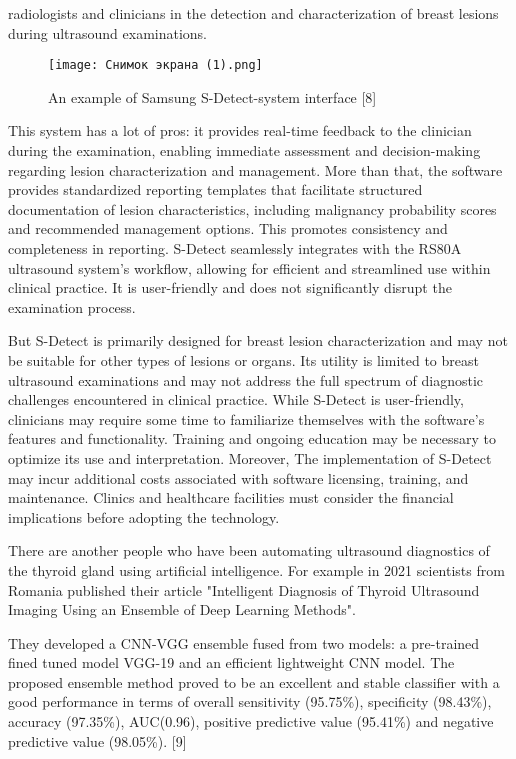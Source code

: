\documentclass[a4paper,10pt,twocolumn]{article}
\begin{document}
 
\setcounter{page}{288}
\vspace{-3 mm}
\hangindent=0.4cm radiologists and clinicians in the detection and characterization of breast lesions during ultrasound examinations.
  
\begin{figure}[h]
     \centering
     \texttt{[image: Снимок экрана (1).png]}
      \caption{\scriptsize{An example of Samsung S-Detect-system interface [8]}}
      \label{fig:figure}
\end{figure} 

This system has a lot of pros: it provides real-time feedback to the clinician during the examination, enabling
immediate assessment and decision-making regarding
lesion characterization and management. More than that,
the software provides standardized reporting templates
that facilitate structured documentation of lesion characteristics, including malignancy probability scores and recommended management options. This promotes consistency and completeness in reporting. S-Detect seamlessly
integrates with the RS80A ultrasound system’s workflow,
allowing for efficient and streamlined use within clinical
practice. It is user-friendly and does not significantly
disrupt the examination process.

But S-Detect is primarily designed for breast lesion
characterization and may not be suitable for other types
of lesions or organs. Its utility is limited to breast
ultrasound examinations and may not address the full
spectrum of diagnostic challenges encountered in clinical practice. While S-Detect is user-friendly, clinicians
may require some time to familiarize themselves with
the software’s features and functionality. Training and
ongoing education may be necessary to optimize its
use and interpretation. Moreover, The implementation
of S-Detect may incur additional costs associated with
software licensing, training, and maintenance. Clinics
and healthcare facilities must consider the financial implications before adopting the technology.

There are another people who have been automating
ultrasound diagnostics of the thyroid gland using artificial intelligence. For example in 2021 scientists from
Romania published their article "Intelligent Diagnosis of
Thyroid Ultrasound Imaging Using an Ensemble of Deep
Learning Methods".

They developed a CNN-VGG ensemble fused from two
models: a pre-trained fined tuned model VGG-19 and an
efficient lightweight CNN model. The proposed ensemble
method proved to be an excellent and stable classifier
with a good performance in terms of overall sensitivity
(95.75\%), specificity (98.43\%), accuracy (97.35\%), AUC(0.96), positive predictive value (95.41\%) and negative
predictive value (98.05\%). [9]
\end{document}
